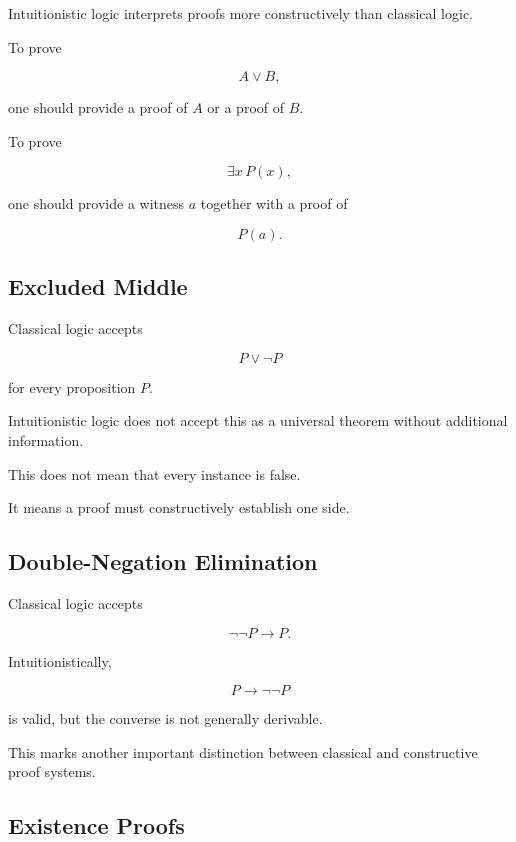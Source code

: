 Intuitionistic logic interprets proofs more constructively than classical
logic.

To prove

\[
\boxed{
A\lor B,
}
\]

one should provide a proof of \(A\) or a proof of \(B\).

To prove

\[
\boxed{
\exists x\,P(x),
}
\]

one should provide a witness \(a\) together with a proof of

\[
P(a).
\]

\subsection{Excluded Middle}
\label{subsec:excluded-middle-proof-theory}

Classical logic accepts

\[
\boxed{
P\lor\neg P
}
\]

for every proposition \(P\).

Intuitionistic logic does not accept this as a universal theorem without
additional information.

This does not mean that every instance is false.

It means a proof must constructively establish one side.

\subsection{Double-Negation Elimination}
\label{subsec:double-negation-elimination-proof}

Classical logic accepts

\[
\boxed{
\neg\neg P
\rightarrow
P.
}
\]

Intuitionistically,

\[
P
\rightarrow
\neg\neg P
\]

is valid, but the converse is not generally derivable.

This marks another important distinction between classical and constructive
proof systems.

\subsection{Existence Proofs}
\label{subsec:constructive-existence-proofs}

